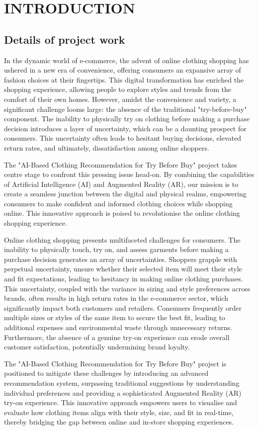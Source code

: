 \chapter{INTRODUCTION}

\section{Details of project work}
	In the dynamic world of e-commerce, the advent of online clothing shopping has ushered in a new era of convenience, offering consumers an expansive array of fashion choices at their fingertips. This digital transformation has enriched the shopping experience, allowing people to explore styles and trends from the comfort of their own homes. However, amidst the convenience and variety, a significant challenge looms large: the absence of the traditional "try-before-buy" component. The inability to physically try on clothing before making a purchase decision introduces a layer of uncertainty, which can be a daunting prospect for consumers. This uncertainty often leads to hesitant buying decisions, elevated return rates, and ultimately, dissatisfaction among online shoppers.

	The "AI-Based Clothing Recommendation for Try Before Buy" project takes centre stage to confront this pressing issue head-on. By combining the capabilities of Artificial Intelligence (AI) and Augmented Reality (AR), our mission is to create a seamless junction between the digital and physical realms, empowering consumers to make confident and informed clothing choices while shopping online. This innovative approach is poised to revolutionise the online clothing shopping experience.

	Online clothing shopping presents multifaceted challenges for consumers. The inability to physically touch, try on, and assess garments before making a purchase decision generates an array of uncertainties. Shoppers grapple with perpetual uncertainty, unsure whether their selected item will meet their style and fit expectations, leading to hesitancy in making online clothing purchases. This uncertainty, coupled with the variance in sizing and style preferences across brands, often results in high return rates in the e-commerce sector, which significantly impact both customers and retailers. Consumers frequently order multiple sizes or styles of the same item to secure the best fit, leading to additional expenses and environmental waste through unnecessary returns. Furthermore, the absence of a genuine try-on experience can erode overall customer satisfaction, potentially undermining brand loyalty.

	The "AI-Based Clothing Recommendation for Try Before Buy" project is positioned to mitigate these challenges by introducing an advanced recommendation system, surpassing traditional suggestions by understanding individual preferences and providing a sophisticated Augmented Reality (AR) try-on experience. This innovative approach empowers users to visualise and evaluate how clothing items align with their style, size, and fit in real-time, thereby bridging the gap between online and in-store shopping experiences.
